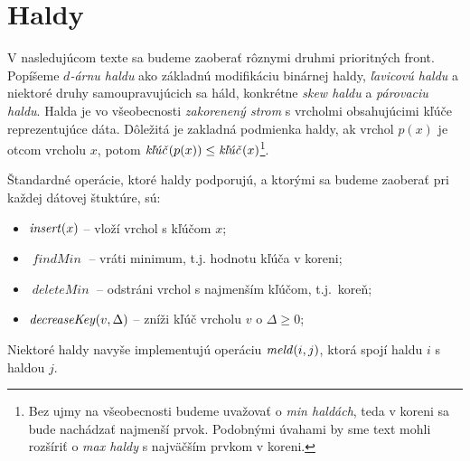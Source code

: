 \section{Haldy}

V nasledujúcom texte sa budeme zaoberať rôznymi druhmi prioritných front. Popíšeme \emph{$d$-árnu haldu} ako 
základnú modifikáciu binárnej haldy, \emph{ľavicovú haldu} a niektoré druhy samoupravujúcich sa háld, konkrétne 
\emph{skew haldu} a \emph{párovaciu haldu}.
Halda je vo všeobecnosti \emph{zakorenený strom} s vrcholmi obsahujúcimi kľúče reprezentujúce dáta. Dôležitá je 
zakladná podmienka haldy, ak vrchol $p(x)$ je otcom vrcholu $x$, potom
$\hbox{\emph{kľúč}}(p(x)) \leq \hbox{\emph{kľúč}}(x)$\footnote{Bez ujmy na všeobecnosti budeme uvažovať o \emph{min haldách},
teda v koreni sa bude nachádzať najmenší prvok. Podobnými úvahami by sme text mohli rozšíriť o \emph{max haldy}
s najväčším prvkom v koreni.}.

Štandardné operácie, ktoré haldy podporujú, a ktorými sa budeme zaoberať pri každej dátovej štuktúre, sú:
\begin{itemize}
\item $\mathop{\mathit{insert}}(x)$ -- vloží vrchol s kľúčom $x$;
\item $\mathop{\mathit{findMin}}$ -- vráti minimum, t.j. hodnotu kľúča v koreni;
\item $\mathop{\mathit{deleteMin}}$ -- odstráni vrchol s najmenším kľúčom, t.j.\ koreň;
\item $\mathop{\mathit{decreaseKey}}(v, \Delta)$ -- zníži kľúč vrcholu $v$ o $\Delta\geq0$;
\end{itemize}

Niektoré haldy navyše implementujú operáciu $\mathop{\mathit{meld}}(i, j)$, ktorá spojí haldu $i$ s haldou $j$.





